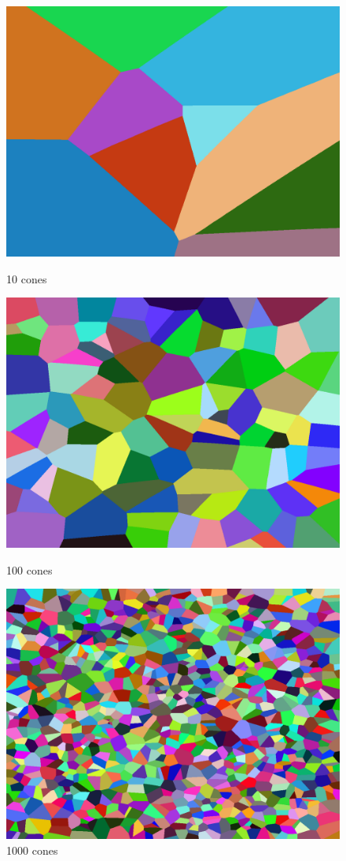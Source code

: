 \documentclass[11pt,a4paper,twoside,openright]{report}
\begin{document}
\begin{figure}[!htb]
  \includegraphics[width=\linewidth]{voronoi10.png}
  \caption{10 cones}\label{fig:voronoi1}
\endminipage\hfill
{}
  \includegraphics[width=\linewidth]{voronoi100.png}
  \caption{100 cones}\label{fig:voronoi2}
\endminipage\hfill
{}%
  \includegraphics[width=\linewidth]{voronoi1000.png}
  \caption{1000 cones}\label{fig:voronoi3}
\endminipage
\end{figure}
\end{document}
